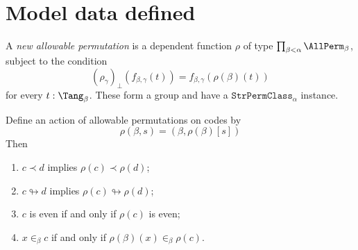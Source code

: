 \section{Model data defined}
\begin{definition}
  \label{def:NewAllPerm}
  A \emph{new allowable permutation} is a dependent function \( \rho \) of type \( \prod_{\beta < \alpha} \AllPerm_\beta \), subject to the condition
  \[ (\rho_\gamma)_\bot(f_{\beta,\gamma}(t)) = f_{\beta,\gamma}(\rho(\beta)(t)) \]
  for every \( t : \Tang_\beta \).
  These form a group and have a \( \texttt{StrPermClass}_\alpha \) instance.
\end{definition}
\begin{proposition}
  \label{prop:AllPerm.smul_cloud_smul}
  Define an action of allowable permutations on codes by
  \[ \rho(\beta, s) = (\beta, \rho(\beta)[s]) \]
  Then
  \begin{enumerate}
    \item \( c \prec d \) implies \( \rho(c) \prec \rho(d) \);
    \item \( c \looparrowright d \) implies \( \rho(c) \looparrowright \rho(d) \);
    \item \( c \) is even if and only if \( \rho(c) \) is even;
    \item \( x \in_\beta c \) if and only if \( \rho(\beta)(x) \in_\beta \rho(c) \).
  \end{enumerate}
\end{proposition}
